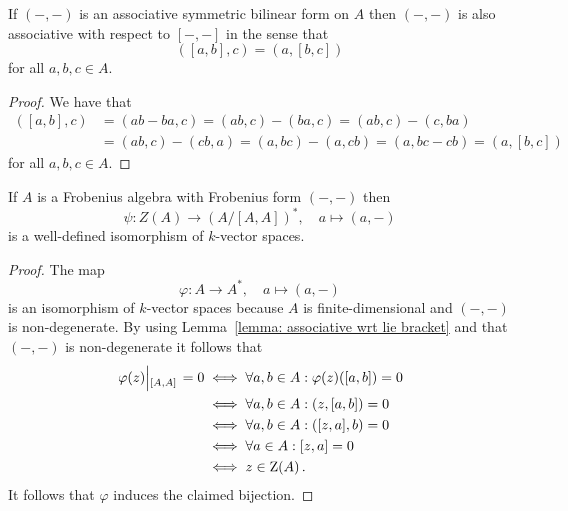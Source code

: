 \begin{lemma}
  \label{lemma: associative wrt lie bracket}
  If $(-,-)$ is an associative symmetric bilinear form on $A$ then $(-,-)$ is also associative with respect to $[-,-]$ in the sense that
  \[
      ( [a,b], c )
    = ( a, [b, c] )
  \]
  for all $a, b, c \in A$.
\end{lemma}


\begin{proof}
  We have that
  \begin{align*}
        ([a,b], c)
    &=  (ab - ba, c)
     =  (ab, c) - (ba, c)
     =  (ab, c) - (c, ba) \\
    &=  (ab, c) - (cb, a)
     =  (a, bc) - (a, cb)
     =  (a, bc - cb)
     =  (a, [b,c])
  \end{align*}
  for all $a, b, c \in A$.
\end{proof}



\begin{proposition}
  If $A$ is a Frobenius algebra with Frobenius form $(-,-)$ then
  \[
            \psi
    \colon  Z(A)
    \to     (A/[A,A])^*,
    \quad   a
    \mapsto (a,-)
  \]
  is a well-defined isomorphism of $k$-vector spaces.
\end{proposition}


\begin{proof}
  The map
  \[
            \varphi
    \colon  A
    \to     A^*,
    \quad   a
    \mapsto (a, -)
  \]
  is an isomorphism of $k$-vector spaces because $A$ is finite-dimensional and $(-,-)$ is non-degenerate.
  By using Lemma~\ref*{lemma: associative wrt lie bracket} and that $(-,-)$ is non-degenerate it follows that
  \begin{align*}
          \restrict*{\varphi(z)}{[A,A]} = 0
    &\iff \forall a,b \in A: \varphi(z)([a,b]) = 0 \\
    &\iff \forall a,b \in A: (z,[a,b]) = 0  \\
    &\iff \forall a,b \in A: ([z,a],b) = 0  \\
    &\iff \forall a \in A:   [z,a] = 0  \\
    &\iff z \in \ringcenter(A) \,.
  \end{align*}
  It follows that $\varphi$ induces the claimed bijection.
\end{proof}






